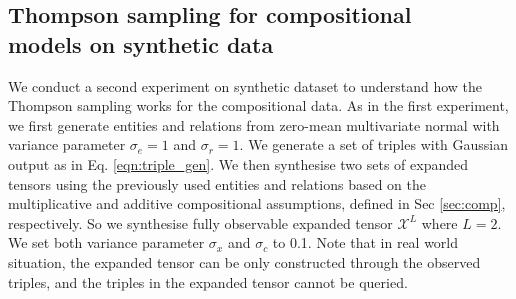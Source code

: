 \subsection{Thompson sampling for compositional\\ models on synthetic data}

We conduct a second experiment on synthetic dataset to understand how
the Thompson sampling works for the compositional data. 
As in the first experiment, we first generate entities and relations from 
zero-mean multivariate normal with variance parameter $\sigma_e = 1$ and 
$\sigma_r=1$. We generate a set of triples with Gaussian output as in 
Eq. \ref{eqn:triple_gen}. We then synthesise two sets of expanded tensors 
using the previously used entities and relations based on the multiplicative 
and additive compositional assumptions, defined in Sec \ref{sec:comp}, 
respectively. So we synthesise fully observable expanded tensor $\mathcal{X}^L$ 
where $L=2$. We set both variance parameter $\sigma_x$ and $\sigma_c$ to 0.1. Note that in real world situation, the expanded tensor can be only constructed through the observed triples, and the triples in the expanded tensor cannot be queried.

